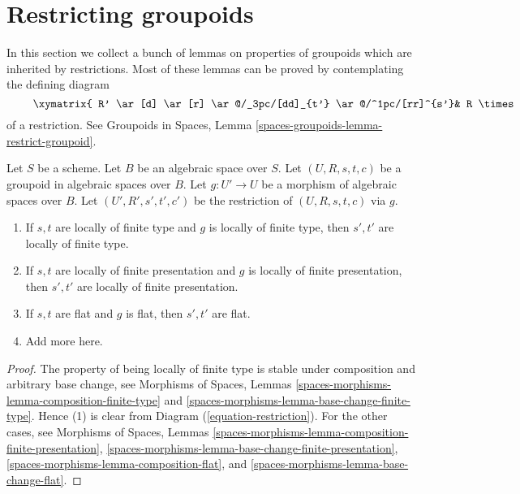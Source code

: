 \section{Restricting groupoids}
\label{section-restricting-groupoids}

\noindent
In this section we collect a bunch of lemmas on
properties of groupoids which are inherited by restrictions.
Most of these lemmas can be proved by contemplating the
defining diagram
\begin{equation}
\label{equation-restriction}
\vcenter{
\xymatrix{
R' \ar[d] \ar[r] \ar@/_3pc/[dd]_{t'} \ar@/^1pc/[rr]^{s'}&
R \times_{s, U} U' \ar[r] \ar[d] &
U' \ar[d]^g \\
U' \times_{U, t} R \ar[d] \ar[r] &
R \ar[r]^s \ar[d]_t &
U \\
U' \ar[r]^g &
U
}
}
\end{equation}
of a restriction. See
Groupoids in Spaces, Lemma \ref{spaces-groupoids-lemma-restrict-groupoid}.

\begin{lemma}
\label{lemma-restrict-preserves-type}
Let $S$ be a scheme. Let $B$ be an algebraic space over $S$.
Let $(U, R, s, t, c)$ be a groupoid in algebraic spaces over $B$.
Let $g : U' \to U$ be a morphism of algebraic spaces over $B$.
Let $(U', R', s', t', c')$ be the restriction of
$(U, R, s, t, c)$ via $g$.
\begin{enumerate}
\item If $s, t$ are locally of finite type and $g$ is locally of finite
type, then $s', t'$ are locally of finite type.
\item If $s, t$ are locally of finite presentation and $g$ is locally of finite
presentation, then $s', t'$ are locally of finite presentation.
\item If $s, t$ are flat and $g$ is flat, then $s', t'$ are flat.
\item Add more here.
\end{enumerate}
\end{lemma}

\begin{proof}
The property of being locally of finite type is stable under composition
and arbitrary base change, see
Morphisms of Spaces,
Lemmas \ref{spaces-morphisms-lemma-composition-finite-type} and
\ref{spaces-morphisms-lemma-base-change-finite-type}.
Hence (1) is clear from Diagram (\ref{equation-restriction}).
For the other cases, see
Morphisms of Spaces,
Lemmas \ref{spaces-morphisms-lemma-composition-finite-presentation},
\ref{spaces-morphisms-lemma-base-change-finite-presentation},
\ref{spaces-morphisms-lemma-composition-flat}, and
\ref{spaces-morphisms-lemma-base-change-flat}.
\end{proof}









